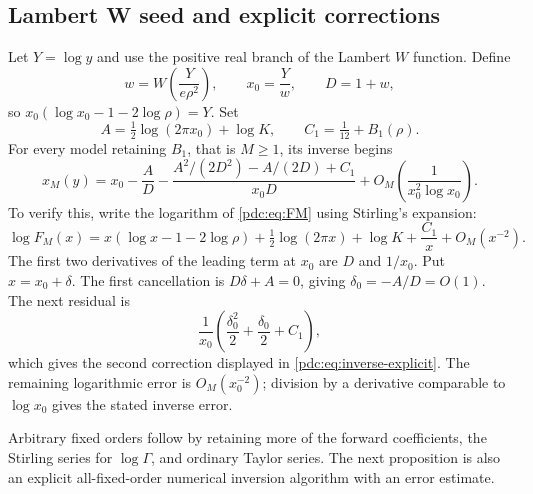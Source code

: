 \documentclass[11pt,letterpaper]{article}
\theoremstyle{remark}\newtheorem{remark}[theorem]{Remark}
\begin{document}
\subsection{Lambert W seed and explicit corrections}
Let $Y=\log y$ and use the positive real branch of the Lambert $W$ function. Define
\begin{equation}\label{pdc:eq:seed}
 w=W\!\left(\frac{Y}{e\rho^2}\right),\qquad
 x_0=\frac{Y}{w},\qquad D=1+w,
\end{equation}
so $x_0(\log x_0-1-2\log\rho)=Y$. Set
\[
 A=\tfrac12\log(2\pi x_0)+\log K,\qquad
 C_1=\tfrac1{12}+B_1(\rho).
\]
For every model retaining $B_1$, that is $M\geq1$, its inverse begins
\begin{equation}\label{pdc:eq:inverse-explicit}
 x_M(y)=x_0-\frac AD
 -\frac{A^2/(2D^2)-A/(2D)+C_1}{x_0D}
 +O_M\!\left(\frac1{x_0^2\log x_0}\right).
\end{equation}
To verify this, write the logarithm of \eqref{pdc:eq:FM} using Stirling's expansion:
\[
 \log F_M(x)=x(\log x-1-2\log\rho)
   +\tfrac12\log(2\pi x)+\log K+\frac{C_1}{x}+O_M(x^{-2}).
\]
The first two derivatives of the leading term at $x_0$ are $D$ and $1/x_0$. Put $x=x_0+\delta$. The first cancellation is $D\delta+A=0$, giving $\delta_0=-A/D=O(1)$. The next residual is
\[
 \frac1{x_0}\left(\frac{\delta_0^2}{2}+
                           \frac{\delta_0}{2}+C_1\right),
\]
which gives the second correction displayed in \eqref{pdc:eq:inverse-explicit}. The remaining logarithmic error is $O_M(x_0^{-2})$; division by a derivative comparable to $\log x_0$ gives the stated inverse error.

Arbitrary fixed orders follow by retaining more of the forward coefficients, the Stirling series for $\log\Gamma$, and ordinary Taylor series. The next proposition is also an explicit all-fixed-order numerical inversion algorithm with an error estimate.
\end{document}
